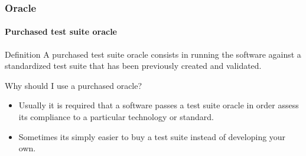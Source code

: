 \begin{frame}[hasprev=true, hasnext=false]
\label{concept:purchased-test-suite-oracle}
\frametitle{Oracle}
\framesubtitle{Purchased test suite oracle}

\begin{block:concept}{Definition}
A purchased test suite oracle consists in running the software against a
standardized test suite that has been previously created and validated.
\end{block:concept}

\begin{block:fact}{Why should I use a purchased oracle?}
\begin{itemize}
	\item Usually it is required that a software passes a test suite oracle
	in order assess its compliance to a particular technology or standard.

	\item Sometimes its simply easier to buy a test suite instead of developing
	your own.
\end{itemize}
\end{block:fact}


\hfill
{}
\end{frame}
